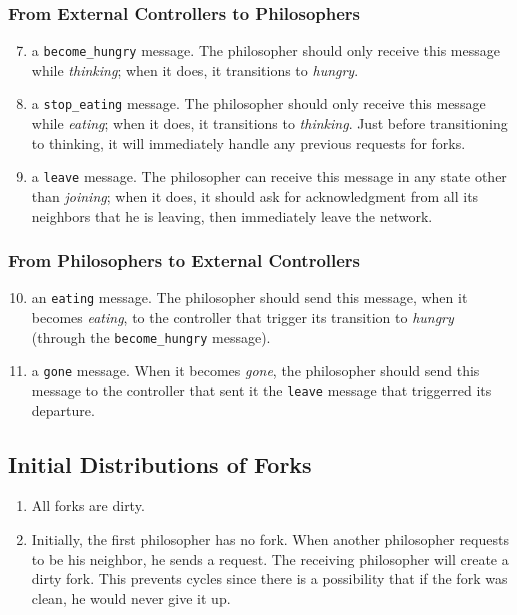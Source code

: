 \documentclass[11pt]{article}
\begin{document}
\subsubsection{From External Controllers to Philosophers}
\begin{enumerate}[M1]
\setcounter{enumi}{6}
\item \label{M:become_hungry} a \texttt{become\_hungry} message. The philosopher should only receive this message while \textit{thinking}; when it does, it transitions to \textit{hungry}.
\item \label{M:stop_eating} a \texttt{stop\_eating} message. The philosopher should only receive this message while \textit{eating}; when it does, it transitions to \textit{thinking}. Just before transitioning to thinking, it will immediately handle any previous requests for forks.
\item \label{M:leave} a \texttt{leave} message. The philosopher can receive this message in any state other than \textit{joining}; when it does, it should ask for acknowledgment from all its neighbors that he is leaving, then immediately leave the network.
\end{enumerate}

\subsubsection{From Philosophers to External Controllers}
\begin{enumerate}[M1]
\setcounter{enumi}{9}
\item an \texttt{eating} message. The philosopher should send this message, when it becomes \textit{eating}, to the controller that trigger its transition to \textit{hungry} (through the \texttt{become\_hungry} message).
\item a \texttt{gone} message. When it becomes \textit{gone}, the philosopher should send this message to the controller that sent it the \texttt{leave} message that triggerred its departure.
\end{enumerate}

\subsection{Initial Distributions of Forks}
\begin{enumerate}
\item All forks are dirty.
\item Initially, the first philosopher has no fork. When another philosopher requests to be his neighbor, he sends a request. The receiving philosopher will create a dirty fork. This prevents cycles since there is a possibility that if the fork was clean, he would never give it up.
\end{enumerate}
\end{document}
